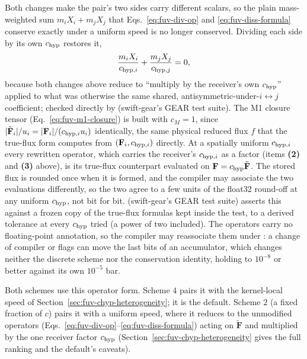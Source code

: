 Both changes make the pair's two sides carry different scalars, so the
plain mass-weighted sum $m_i X_i + m_j X_j$ that
Eqs.~\ref{eq:fuv-div-op} and \ref{eq:fuv-diss-formula} conserve exactly
under a uniform speed is no longer conserved. Dividing each side by its
own $c_{\rm hyp}$ restores it,
\begin{equation}
  \frac{m_i X_i}{c_{{\rm hyp},i}} + \frac{m_j X_j}{c_{{\rm hyp},j}} = 0 ,
  \label{eq:fuv-variable-c-conservation}
\end{equation}
because both changes above reduce to ``multiply by the receiver's own
$c_{\rm hyp}$'' applied to what was otherwise the same shared,
antisymmetric-under-$i\leftrightarrow j$ coefficient; checked directly by
 (swift-gear's GEAR test
suite). The M1 closure
tensor (Eq.~\ref{eq:fuv-m1-closure}) is built with $c_M=1$, since
$|\tilde{\mathbf F}_i|/u_i = |\mathbf F_i|/(c_{{\rm hyp},i}u_i)$ identically,
the same physical reduced flux $f$ that the true-flux form computes from
$(\mathbf F_i, c_{{\rm hyp},i})$ directly. At a spatially uniform
$c_{{\rm hyp},i}$ every rewritten operator, which carries the receiver's
$c_{{\rm hyp},i}$ as a factor (items \textbf{(2)} and \textbf{(3)} above), is
its true-flux counterpart evaluated on
$\mathbf F = c_{\rm hyp}\tilde{\mathbf F}$.
The stored flux is rounded once when it is formed, and the compiler may
associate the two evaluations differently, so the two agree to a few units of
the float32 round-off at any uniform $c_{\rm hyp}$, not bit for bit.
(swift-gear's GEAR test suite) asserts this against a frozen copy of the
true-flux formulas kept inside the test, to a derived tolerance at every
$c_{\rm hyp}$ tried (a power of two included). The operators carry
no floating-point annotation, so the compiler may reassociate them under
: a change of compiler or flags can move the last bits of an
accumulator, which changes neither the discrete scheme nor the conservation
identity, holding to $10^{-8}$ or better against its own $10^{-5}$ bar.

Both schemes use this operator form. Scheme $4$ pairs it with the kernel-local
speed of Section~\ref{sec:fuv-chyp-heterogeneity}; it is the default. Scheme $2$ (a fixed fraction of $c$) pairs it with a uniform
speed, where it reduces to the unmodified operators
(Eqs.~\ref{eq:fuv-div-op}--\ref{eq:fuv-diss-formula}) acting on
$\tilde{\mathbf F}$ and multiplied by the one receiver factor $c_{\rm hyp}$
(Section~\ref{sec:fuv-chyp-heterogeneity} gives the full ranking and the
default's caveats).

